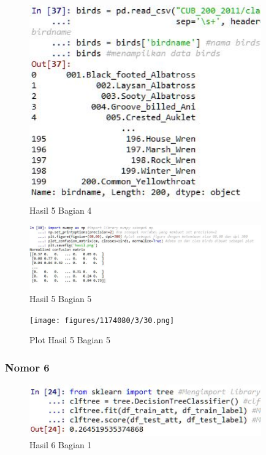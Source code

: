 
\begin{figure}[H]
\centerline{\includegraphics[width=10cm]{figures/1174080/3/28.jpg}}
\caption{Hasil 5 Bagian 4}
\label{labelgambar}
\end{figure}


\begin{figure}[H]
\centerline{\includegraphics[width=10cm]{figures/1174080/3/29.jpg}}
\caption{Hasil 5 Bagian 5}
\label{labelgambar}
\end{figure}

\begin{figure}[H]
\centerline{\texttt{[image: figures/1174080/3/30.png]}}
\caption{Plot Hasil 5 Bagian 5}
\label{labelgambar}
\end{figure}

\subsubsection{Nomor 6}
\hfill\break

\begin{figure}[H]
\centerline{\includegraphics[width=10cm]{figures/1174080/3/31.jpg}}
\caption{Hasil 6 Bagian 1}
\label{labelgambar}
\end{figure}

